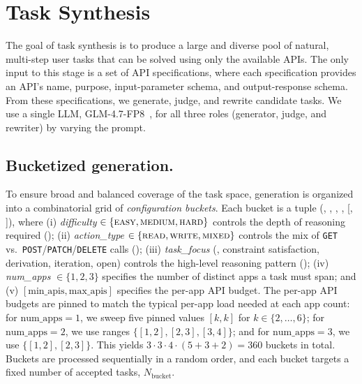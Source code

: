 



\section{Task Synthesis}

\label{sec:task_synthesis}
The goal of task synthesis is to produce a large and diverse pool of natural, multi-step user tasks that can be solved using only the available APIs. The only input to this stage is a set of API specifications, where each specification provides an API's name,
purpose, input-parameter schema, and output-response schema. From these specifications, we generate, judge, and rewrite candidate tasks. We use a single LLM, GLM-4.7-FP8~\citep{glm-4.7}, for all three roles (generator, judge, and rewriter) by varying the prompt.

\subsection{Bucketized generation.}
\label{sec:bucket-gen}
To ensure broad and balanced coverage of the task space, generation is organized into a combinatorial grid of \emph{configuration buckets}. Each bucket is a tuple (, , , , [, ]), where (i) \emph{difficulty} $\in\{\textsc{easy},\textsc{medium},\textsc{hard}\}$ controls the depth of reasoning required (); (ii) \emph{action\_type} $\in\{\textsc{read},\textsc{write},\textsc{mixed}\}$ controls the mix of \texttt{GET} vs.\ \texttt{POST}/\texttt{PATCH}/\texttt{DELETE} calls (); (iii) \emph{task\_focus} (\eg, constraint satisfaction, derivation, iteration, open) controls the high-level reasoning pattern (); (iv) \emph{num\_apps} $\in\{1,2,3\}$ specifies the number of distinct apps a task must span; and (v) $[\text{min\_apis},\text{max\_apis}]$ specifies the per-app API budget. The per-app API budgets are pinned to match the typical per-app load needed at each app count: for $\text{num\_apps}=1$, we sweep five pinned values $[k,k]$ for $k\in\{2,\dots,6\}$; for $\text{num\_apps}=2$, we use ranges $\{[1,2],[2,3],[3,4]\}$; and for $\text{num\_apps}=3$, we use $\{[1,2],[2,3]\}$. This yields $3\cdot 3\cdot 4\cdot(5+3+2)=360$ buckets in total. Buckets are processed sequentially in a random order, and each bucket targets a fixed number of accepted tasks, $N_{\text{bucket}}$.


